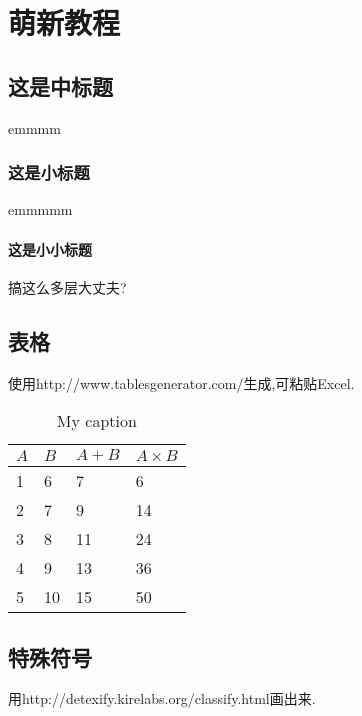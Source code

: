 \chapter{萌新教程}
\section{这是中标题}
emmmm
\subsection{这是小标题}
emmmmm
\subsubsection{这是小小标题}
搞这么多层大丈夫?

\section{表格}

使用http://www.tablesgenerator.com/生成,可粘贴Excel.

\begin{table}[!h]
\centering
\caption{My caption}
\label{my-label}
\begin{tabular}{@{}llll@{}}
\toprule
$A$ & $B$  & $A+B$ & $A\times B$ \\ \midrule
1 & 6  & 7   & 6   \\
2 & 7  & 9   & 14  \\
3 & 8  & 11  & 24  \\
4 & 9  & 13  & 36  \\
5 & 10 & 15  & 50  \\ \bottomrule
\end{tabular}
\end{table}

\section{特殊符号}
用http://detexify.kirelabs.org/classify.html画出来.
\endinput